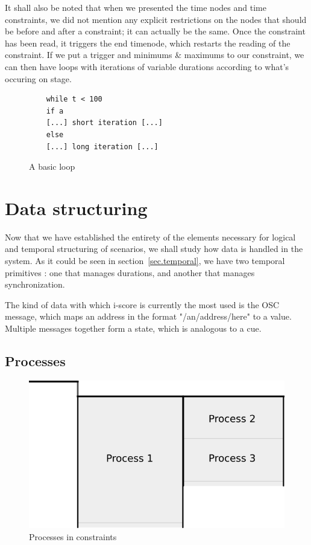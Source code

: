 \documentclass{sigchi}
\begin{document}
It shall also be noted that when we presented the time nodes and time constraints, we did not mention any explicit restrictions on the nodes that should be before and after a constraint; it can actually be the same. Once the constraint has been read, it triggers the end timenode, which restarts the reading of the constraint. If we put a trigger and minimums \& maximums to our constraint, we can then have loops with iterations of variable durations according to what's occuring on stage.

\begin{figure}
	\centering
	\begin{lstlisting}
	while t < 100
	if a
	[...] short iteration [...]
	else
	[...] long iteration [...]           
	\end{lstlisting}
	\caption{A basic loop}	
	\label{fig.loopcode}
\end{figure}

\section{Data structuring}
Now that we have established the entirety of the elements necessary for logical and temporal structuring of scenarios, we shall study how data is handled in the system.
As it could be seen in section~\ref{sec.temporal}, we have two temporal primitives : one that manages durations, and another that manages synchronization.

The kind of data with which i-score is currently the most used is the OSC message, which maps an address in the format "/an/address/here" to a value. Multiple messages together form a state, which is analogous to a cue.

\subsection{Processes}

\begin{figure}[h]
    \centering
    \includegraphics[scale=0.5]{images/processes.png}
    \caption{Processes in constraints}
    \label{fig.processes} 
\end{figure}
\end{document}

